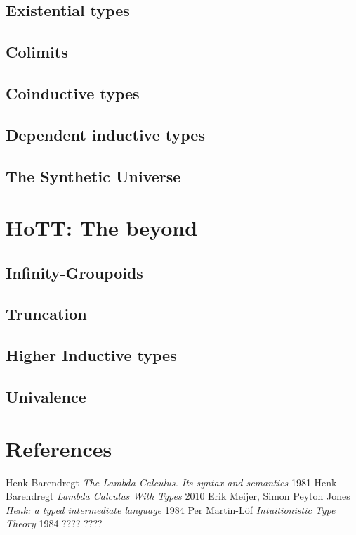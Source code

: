 \documentclass[11pt,oneside]{article}
\begin{document}
\subsection{Existential types}
\subsection{Colimits}
\subsection{Coinductive types}
\subsection{Dependent inductive types}
\subsection{The Synthetic Universe}

\section{HoTT: The beyond}
\subsection{Infinity-Groupoids}
\subsection{Truncation}
\subsection{Higher Inductive types}
\subsection{Univalence}

\newpage
\section{References}
\begin{thebibliography}{9}

      Henk Barendregt \textit{The Lambda Calculus. Its syntax and semantics} 1981
      Henk Barendregt \textit{Lambda Calculus With Types} 2010
       Erik Meijer, Simon Peyton Jones \textit{Henk: a typed intermediate language} 1984
        Per Martin-Löf \textit{Intuitionistic Type Theory} 1984
 ????
 ????

\end{thebibliography}
\end{document}
